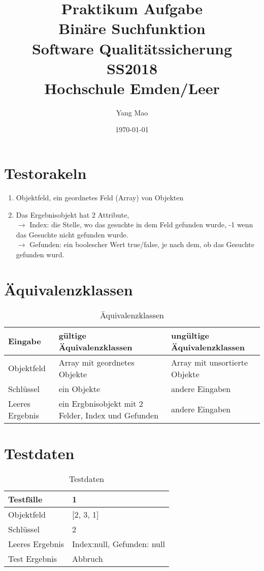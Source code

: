 \documentclass[12pt,a4paper]{article}
\title{	
\textbf{Praktikum Aufgabe\\
		Binäre Suchfunktion\\}
	    Software Qualitätssicherung\\
		SS2018\\
		Hochschule Emden/Leer}
\author{Yang Mao}
\date{\today}
\begin{document}
    \maketitle
    \newpage
    
    \tableofcontents
    \newpage
	
\section{Testorakeln}
	\begin{enumerate}
		\item Objektfeld, ein geordnetes Feld (Array) von Objekten
		\item Das Ergebnisobjekt hat 2 Attribute,
		\\ $\rightarrow$ Index: die Stelle, wo das gesuchte in dem Feld gefunden wurde, -1 wenn das Gesuchte nicht	gefunden wurde.
		\\ $\rightarrow$ Gefunden:  ein boolescher Wert true/false, je nach dem, ob das Gesuchte gefunden wurd.
	\end{enumerate}
\section{Äquivalenzklassen}

\begin{table}[H]
	\centering
	\small
	\setlength
	\tabcolsep{2pt}
	\begin{tabular}{l|l|l}
		Eingabe & gültige Äquivalenzklassen & ungültige Äquivalenzklassen \\ \hline
		Objektfeld & Array mit geordnetes Objekte & Array mit  unsortierte Objekte \\ [-3pt]
		Schlüssel & ein Objekte & andere Eingaben \\ 
		Leeres Ergebnis & ein Ergbnisobjekt mit 2 Felder, Index und Gefunden & andere Eingaben	
	\end{tabular}
		\caption{Äquivalenzklassen}
\end{table}
    	
\section{Testdaten}
   \begin{table}[H]
   	\centering
   	\begin{tabular}{l|l}
   		Testfälle & 1 \\ \hline
   		Objektfeld & [2, 3, 1] \\ \hline
   		Schlüssel & 2 \\ \hline
   		Leeres Ergebnis & {Index:null, Gefunden: null} \\ \hline
   		Test Ergebnis & Abbruch 
   	\end{tabular}
   		\caption{Testdaten}
   \end{table}
    
\end{document}
